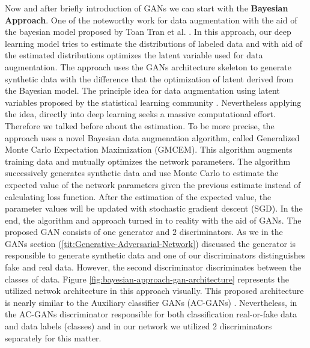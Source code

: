 Now and after briefly introduction of GANs we can start with the \textbf{Bayesian Approach}. One of
the noteworthy work for data augmentation with the aid of the bayesian model proposed by Toan Tran
et al. \cite{bayesian_approach}. In this approach, our deep learning model tries to estimate the
distributions of labeled data and with aid of the estimated distributions optimizes the latent
variable used for data augmentation. The approach uses the GANs architecture skeleton to generate
synthetic data with the difference that the optimization of latent derived from the Bayesian model.
The principle idea for data augmentation using latent variables proposed by the statistical learning
community \cite{Statistical_data_augmentation}. Nevertheless applying the idea, directly into deep
learning seeks a massive computational effort. Therefore we talked before about the estimation. To
be more precise, the
approach uses a novel Bayesian data augmenation algorithm, called Generalized Monte Carlo Expectation Maximization
(GMCEM). This algorithm augments training data and mutually optimizes the network parameters. The
algorithm successively generates synthetic data and use Monte Carlo to estimate the expected value
of the network parameters given the previous estimate instead of calculating loss function. After
the estimation of the expected value, the parameter values will be updated with stochastic gradient
descent (SGD). In the end, the algorithm and approach turned in to reality with the aid of GANs. The
proposed GAN consists of one generator and $2$ discriminators. As we in the GANs section
(\ref{tit:Generative-Adversarial-Network}) discussed the generator is responsible to generate
synthetic data and one of our discriminators distinguishes fake and real data. However, the second
discriminator discriminates between the classes of data. Figure
\ref{fig:bayesian-approach-gan-architecture} represents the utilized netwok architecture in this
approach visually. This proposed architecture is nearly similar to the Auxiliary classifier GANs
(AC-GANs) \cite{AC-GANS}. Nevertheless, in the AC-GANs discriminator responsible for both
classification real-or-fake data and data labels (classes) and in our network we utilized $2$
discriminators separately for this matter.

